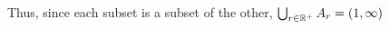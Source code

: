 \documentclass[10pt]{exam}
\begin{document}
\begin{enumerate}
\begin{enumerate}

        Thus, since each subset is a subset of the other, $\bigcup_{r\in \mathbb R^+} A_r = (1, \infty)$
    \end{enumerate}




    
\end{enumerate}

    
\end{document}
